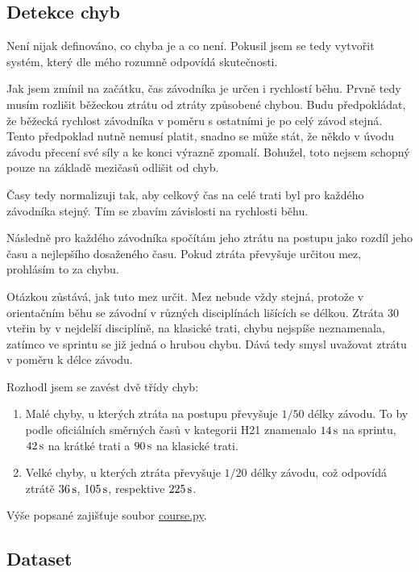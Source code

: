 \documentclass[a4paper,11pt]{article}
\begin{document}
\subsection*{Detekce chyb}

Není nijak definováno, co chyba je a co není. Pokusil jsem se tedy vytvořit
systém, který dle mého rozumně odpovídá skutečnosti.

Jak jsem zmínil na začátku, čas závodníka je určen i rychlostí běhu. Prvně tedy
musím rozlišit běžeckou ztrátu od ztráty způsobené chybou. Budu předpokládat, že
běžecká rychlost závodníka v poměru s ostatními je po celý závod stejná.
Tento předpoklad nutně nemusí platit, snadno se může stát, že někdo v úvodu
závodu přecení své síly a ke konci výrazně zpomalí. Bohužel, toto nejsem schopný
pouze na základě mezičasů odlišit od chyb.

Časy tedy normalizuji tak, aby celkový čas na celé trati byl pro každého
závodníka stejný. Tím se zbavím závislosti na rychlosti běhu.

Následně pro každého závodníka spočítám jeho ztrátu na postupu jako rozdíl jeho
času a nejlepšího dosaženého času. Pokud ztráta převyšuje určitou mez, prohlásím
to za chybu.

Otázkou zůstává, jak tuto mez určit. Mez nebude vždy stejná, protože v
orientačním běhu se závodní v různých disciplínách lišících se délkou. Ztráta 30
vteřin by v nejdelší disciplíně, na klasické trati, chybu nejspíše neznamenala,
zatímco ve sprintu se již jedná o hrubou chybu. Dává tedy smysl uvažovat ztrátu
v poměru k délce závodu.

Rozhodl jsem se zavést dvě třídy chyb:
\begin{enumerate}
    \item Malé chyby, u kterých ztráta na postupu převyšuje $1/50$ délky závodu.
    To by podle oficiálních směrných časů v kategorii H21 znamenalo $14\,\rm s$
    na sprintu, $42\,\rm s$ na krátké trati a $90\,\rm s$ na klasické trati.
    \item Velké chyby, u kterých ztráta převyšuje $1/20$ délky závodu, což
    odpovídá ztrátě $36\,\rm s$, $105\,\rm s$, respektive $225\,\rm s$.
\end{enumerate}

Výše popsané zajišťuje soubor \href{TODO}{course.py}.

\subsection*{Dataset}
\end{document}
